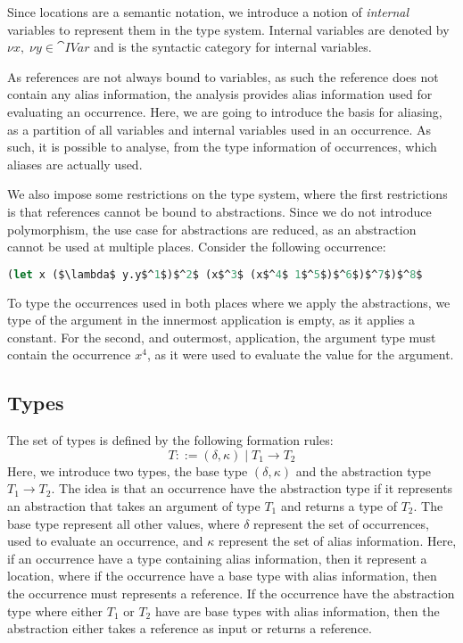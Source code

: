 \documentclass[acmsmall,sigplan]{acmart}
\begin{document}
Since locations are a semantic notation, we introduce a notion of
\emph{internal} variables to represent them in the type
system. Internal variables are denoted by
$\nu x,\; \nu y\in\cat{IVar}$ and  is the syntactic category
for internal variables.

As references are not always bound to variables, as such the reference
does not contain any alias information, the analysis provides alias
information used for evaluating an occurrence.  Here, we are going to
introduce the basis for aliasing, as a partition of all variables and
internal variables used in an occurrence.  As such, it is possible to
analyse, from the type information of occurrences, which aliases are
actually used.

We also impose some restrictions on the type system, where the first
restrictions is that references cannot be bound to abstractions.
Since we do not introduce polymorphism, the use case for abstractions
are reduced, as an abstraction cannot be used at multiple places.
Consider the following occurrence:
\begin{lstlisting}[language=Caml, mathescape=true]
(let x ($\lambda$ y.y$^1$)$^2$ (x$^3$ (x$^4$ 1$^5$)$^6$)$^7$)$^8$
\end{lstlisting}
To type the occurrences used in both places where we apply the abstractions, we type of the argument in the innermost application is empty, as it applies a constant.
For the second, and outermost, application, the argument type must contain the occurrence $x^4$, as it were used to evaluate the value for the argument.

\subsection{Types}\label{sec:types}

The set of types  is defined by the following formation rules:
%
\[ T ::=(\delta,\kappa)\mid T_1 \rightarrow T_2 \]
%
Here, we introduce two types, the base type $(\delta,\kappa)$ and the abstraction type $T_1 \rightarrow T_2$.
The idea is that an occurrence have the abstraction type if it represents an abstraction that takes an argument of type $T_1$ and returns a type of $T_2$.
The base type represent all other values, where $\delta$ represent the set of occurrences, used to evaluate an occurrence, and $\kappa$ represent the set of alias information.
Here, if an occurrence have a type containing alias information, then it represent a location, where if the occurrence have a base type with alias information, then the occurrence must represents a reference. 
If the occurrence have the abstraction type where either $T_1$ or $T_2$ have are base types with alias information, then the abstraction either takes a reference as input or returns a reference.
\end{document}
